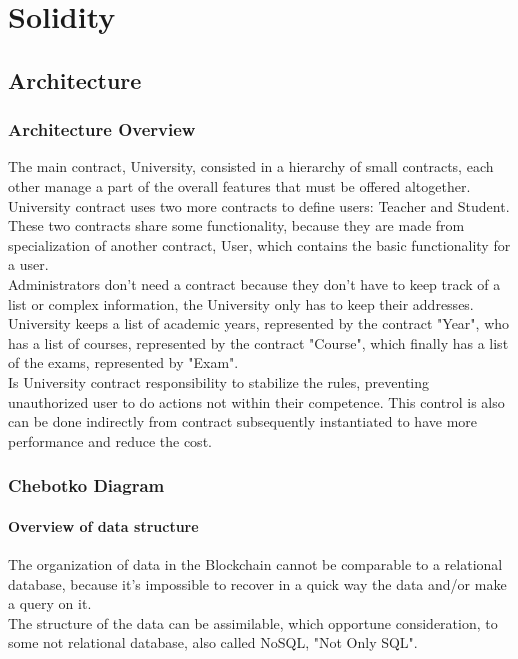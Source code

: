 \documentclass[ManualeSviluppatore.tex]{subfiles}
\begin{document}

\chapter{Solidity}
\section{Architecture}
\subsection{Architecture Overview}
The main contract, University, consisted in a hierarchy of small contracts, each other manage a part of the overall features that must be offered altogether.\\
University contract uses two more contracts to define users: Teacher and Student. These two contracts share some functionality, because they are made from specialization of another contract, User, which contains the basic functionality for a user.\\
Administrators don't need a contract because they don't have to keep track of a list or complex information, the University only has to keep their addresses.\\
University keeps a list of academic years, represented by the contract "Year", who has a list of courses, represented by the contract "Course", which finally has a list of the exams, represented by "Exam".\\

Is University contract responsibility to stabilize the rules, preventing unauthorized user to do actions not within their competence. This control is also can be done indirectly from contract subsequently instantiated to have more performance and reduce the cost.\\

\subsection{Chebotko Diagram}
\subsubsection{Overview of data structure}
The organization of data in the Blockchain cannot be comparable to a relational database, because it's impossible to recover in a quick way the data and/or make a query on it.\\
The structure of the data can be assimilable, which opportune consideration, to some not relational database, also called NoSQL, "Not Only SQL".\\
\end{document}
